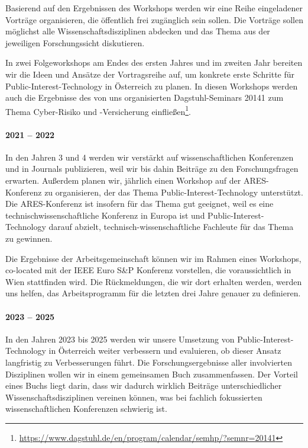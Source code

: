 \documentclass[11pt]{scrartcl}
\begin{document}
Basierend auf den Ergebnissen des Workshops werden wir eine Reihe eingeladener Vorträge organisieren, die öffentlich frei zugänglich sein sollen. Die Vorträge sollen möglichst alle Wissenschaftsdisziplinen abdecken und das Thema aus der jeweiligen Forschungssicht diskutieren.

In zwei Folgeworkshops am Endes des ersten Jahres und im zweiten Jahr bereiten wir die Ideen und Ansätze der Vortragsreihe auf, um konkrete erste Schritte für Public-Interest-Technology in Österreich zu planen. In diesen Workshops werden auch die Ergebnisse des von uns organisierten Dagstuhl-Seminars 20141 zum Thema Cyber-Risiko und -Versicherung einfließen\footnote{\url{https://www.dagstuhl.de/en/program/calendar/semhp/?semnr=20141}}. 

\paragraph{2021 -- 2022}

In den Jahren 3 und 4 werden wir verstärkt auf wissenschaftlichen Konferenzen und in Journals publizieren, weil wir bis dahin Beiträge zu den Forschungsfragen erwarten. Außerdem planen wir, jährlich einen Workshop auf der ARES-Konferenz zu organisieren, der das Thema Public-Interest-Technology unterstützt. Die ARES-Konferenz ist insofern für das Thema gut geeignet, weil es eine technisch\-wissenschaftliche Konferenz in Europa ist und Public-Interest-Technology  darauf abzielt, technisch-wissenschaftliche Fachleute für das Thema zu gewinnen.

Die Ergebnisse der Arbeitsgemeinschaft können wir im Rahmen eines Workshops, co-located mit der IEEE Euro S\&P Konferenz vorstellen, die voraussichtlich in Wien stattfinden wird. Die Rückmeldungen, die wir dort erhalten werden, werden uns helfen, das Arbeitsprogramm für die letzten drei Jahre genauer zu definieren.

\paragraph{2023 -- 2025}

In den Jahren 2023 bis 2025 werden wir unsere Umsetzung von Public-Interest-Technology in Österreich weiter verbessern und evaluieren, ob dieser Ansatz langfristig zu Verbesserungen führt. Die Forschungsergebnisse aller involvierten Disziplinen wollen wir in einem gemeinsamen Buch zusammenfassen. Der Vorteil eines Buchs liegt darin, dass wir dadurch wirklich Beiträge unterschiedlicher Wissenschaftsdisziplinen vereinen können, was bei fachlich fokussierten wissenschaftlichen Konferenzen schwierig ist. 
\end{document}
